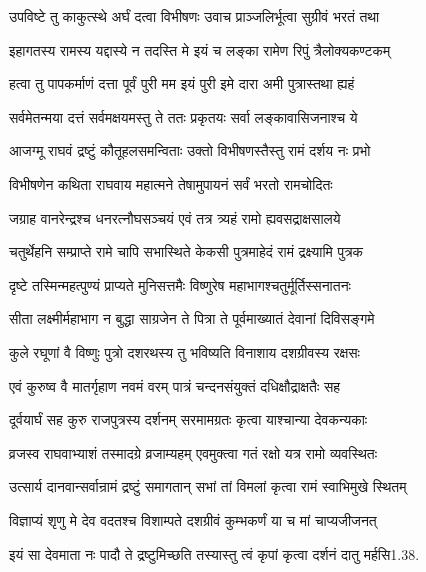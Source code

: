 \twolineshloka
{उपविष्टे तु काकुत्स्थे अर्घं दत्वा विभीषणः}
{उवाच प्राञ्जलिर्भूत्वा सुग्रीवं भरतं तथा}%

\twolineshloka
{इहागतस्य रामस्य यद्दास्ये न तदस्ति मे}
{इयं च लङ्का रामेण रिपुं त्रैलोक्यकण्टकम्}%

\twolineshloka
{हत्वा तु पापकर्माणं दत्ता पूर्वं पुरी मम}
{इयं पुरी इमे दारा अमी पुत्रास्तथा ह्यहं}%

\twolineshloka
{सर्वमेतन्मया दत्तं सर्वमक्षयमस्तु ते}
{ततः प्रकृतयः सर्वा लङ्कावासिजनाश्च ये}%

\twolineshloka
{आजग्मू राघवं द्रष्टुं कौतूहलसमन्विताः}
{उक्तो विभीषणस्तैस्तु रामं दर्शय नः प्रभो}%

\twolineshloka
{विभीषणेन कथिता राघवाय महात्मने}
{तेषामुपायनं सर्वं भरतो रामचोदितः}%

\twolineshloka
{जग्राह वानरेन्द्रश्च धनरत्नौघसञ्चयं}
{एवं तत्र त्र्यहं रामो ह्यवसद्राक्षसालये}%

\twolineshloka
{चतुर्थेहनि सम्प्राप्ते रामे चापि सभास्थिते}
{केकसी पुत्रमाहेदं रामं द्रक्ष्यामि पुत्रक}%

\twolineshloka
{दृष्टे तस्मिन्महत्पुण्यं प्राप्यते मुनिसत्तमैः}
{विष्णुरेष महाभागश्चतुर्मूर्तिस्सनातनः}%

\twolineshloka
{सीता लक्ष्मीर्महाभाग न बुद्धा साग्रजेन ते}
{पित्रा ते पूर्वमाख्यातं देवानां दिविसङ्गमे}%

\twolineshloka
{कुले रघूणां वै विष्णुः पुत्रो दशरथस्य तु}
{भविष्यति विनाशाय दशग्रीवस्य रक्षसः}%


\twolineshloka
{एवं कुरुष्व वै मातर्गृहाण नवमं वरम्}
{पात्रं चन्दनसंयुक्तं दधिक्षौद्राक्षतैः सह}%

\twolineshloka
{दूर्वयार्घं सह कुरु राजपुत्रस्य दर्शनम्}
{सरमामग्रतः कृत्वा याश्चान्या देवकन्यकाः}%

\twolineshloka
{व्रजस्व राघवाभ्याशं तस्मादग्रे व्रजाम्यहम्}
{एवमुक्त्वा गतं रक्षो यत्र रामो व्यवस्थितः}%

\twolineshloka
{उत्सार्य दानवान्सर्वान्रामं द्रष्टुं समागतान्}
{सभां तां विमलां कृत्वा रामं स्वाभिमुखे स्थितम्}%


\twolineshloka
{विज्ञाप्यं शृणु मे देव वदतश्च विशाम्पते}
{दशग्रीवं कुम्भकर्णं या च मां चाप्यजीजनत्}%

\twolineshloka
{इयं सा देवमाता नः पादौ ते द्रष्टुमिच्छति}
{तस्यास्तु त्वं कृपां कृत्वा दर्शनं दातु मर्हसि1.38.}%



